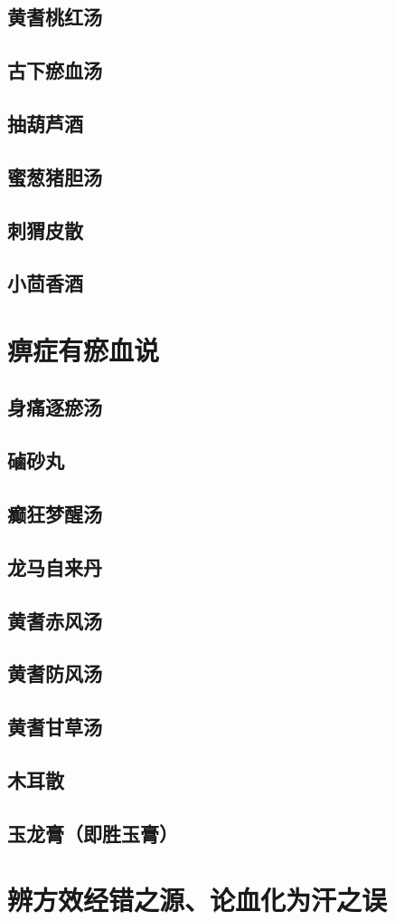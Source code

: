 \documentclass[a4paper,12pt,UTF8,twoside]{ctexbook}
\begin{document}
	\section{黄耆桃红汤}
	\section{古下瘀血汤}
	\section{抽葫芦酒}
	\section{蜜葱猪胆汤}
	\section{刺猬皮散}
	\section{小茴香酒}
	\chapter{痹症有瘀血说}
	\section{身痛逐瘀汤}
	\section{磠砂丸}
	\section{癫狂梦醒汤}
	\section{龙马自来丹}
	\section{黄耆赤风汤}
	\section{黄耆防风汤}
	\section{黄耆甘草汤}
	\section{木耳散}
	\section{玉龙膏（即胜玉膏）}
	\chapter{辨方效经错之源、论血化为汗之误}
	
\end{document}
